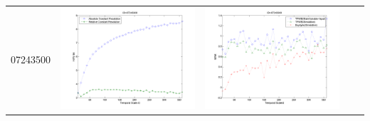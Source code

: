 \documentclass[11pt]{article}
\begin{document}
\begin{table}[H]
{\begin{tabular}{c  c   c   c  c }
07243500&\begin{minipage}{.4\textwidth}\includegraphics[width=\linewidth]{resultgraph/07243500e.png}\end{minipage}
&\begin{minipage}{.4\textwidth}\includegraphics[width=\linewidth]{resultgraph/07243500MI.png}\end{minipage}

\end{tabular}}
\end{table}
\end{document}
